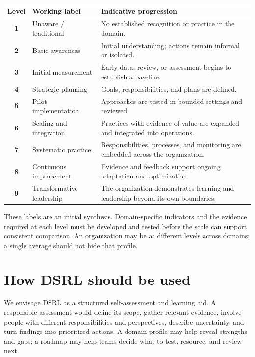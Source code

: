 \documentclass[11pt,a4paper]{article}
\begin{document}
\begin{center}
\small
\begin{tabularx}{\textwidth}{>{\bfseries}c l X}
\toprule
Level & Working label & Indicative progression \\
\midrule
1 & Unaware / traditional & No established recognition or practice in the domain. \\
2 & Basic awareness & Initial understanding; actions remain informal or isolated. \\
3 & Initial measurement & Early data, review, or assessment begins to establish a baseline. \\
4 & Strategic planning & Goals, responsibilities, and plans are defined. \\
5 & Pilot implementation & Approaches are tested in bounded settings and reviewed. \\
6 & Scaling and integration & Practices with evidence of value are expanded and integrated into operations. \\
7 & Systematic practice & Responsibilities, processes, and monitoring are embedded across the organization. \\
8 & Continuous improvement & Evidence and feedback support ongoing adaptation and optimization. \\
9 & Transformative leadership & The organization demonstrates learning and leadership beyond its own boundaries. \\
\bottomrule
\end{tabularx}
\end{center}

These labels are an initial synthesis. Domain-specific indicators and the evidence required at each level must be developed and tested before the scale can support consistent comparison. An organization may be at different levels across domains; a single average should not hide that profile.

\section*{How DSRL should be used}
We envisage DSRL as a structured self-assessment and learning aid. A responsible assessment would define its scope, gather relevant evidence, involve people with different responsibilities and perspectives, describe uncertainty, and turn findings into prioritized actions. A domain profile may help reveal strengths and gaps; a roadmap may help teams decide what to test, resource, and review next.
\end{document}
